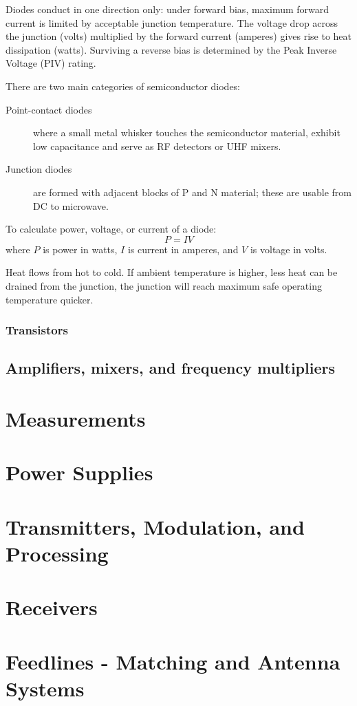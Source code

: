 \documentclass[letterpaper]{article}
\begin{document}
        Diodes conduct in one direction only:
        under forward bias, maximum forward current is limited by acceptable junction temperature.
        The voltage drop across the junction (volts) multiplied by the forward current (amperes) gives rise to heat dissipation (watts).
        Surviving a reverse bias is determined by the Peak Inverse Voltage (PIV) rating.

        There are two main categories of semiconductor diodes:
        \begin{description}
            \item[Point-contact diodes] where a small metal whisker touches the semiconductor material, exhibit low capacitance and serve as RF detectors or UHF mixers.
            \item[Junction diodes] are formed with adjacent blocks of P and N material; these are usable from DC to microwave.
        \end{description}

        To calculate power, voltage, or current of a diode:
        $$ P = I V $$
        where $ P $ is power in watts, $ I $ is current in amperes, and $ V $ is voltage in volts.

        Heat flows from hot to cold.
        If ambient temperature is higher, less heat can be drained from the junction, the junction will reach maximum safe operating temperature quicker.

        \subsubsection{Transistors}

        \newpage

        \subsection{Amplifiers, mixers, and frequency multipliers}

        \newpage

        \section{Measurements}

        \newpage

        \section{Power Supplies}

    \newpage

    \section{Transmitters, Modulation, and Processing}

    \newpage

    \section{Receivers}

    \newpage

    \section{Feedlines - Matching and Antenna Systems}
\end{document}
